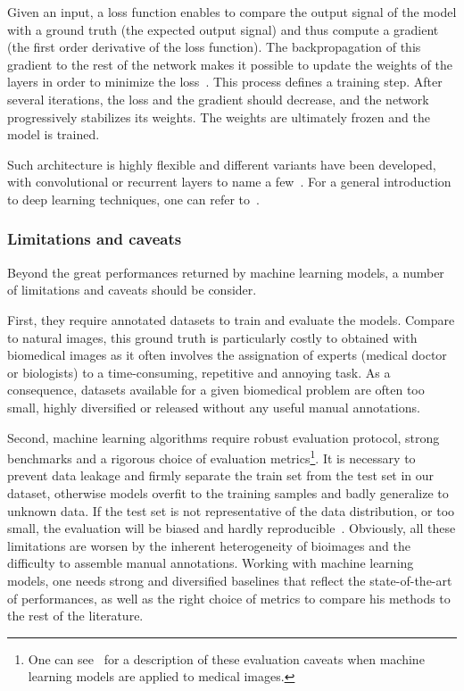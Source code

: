 Given an input, a loss function enables to compare the output signal of the model with a ground truth (the expected output signal) and thus compute a gradient (the first order derivative of the loss function).
The backpropagation of this gradient to the rest of the network makes it possible to update the weights of the layers in order to minimize the loss~\cite{rumelhart_learning_1986}.
This process defines a training step.
After several iterations, the loss and the gradient should decrease, and the network progressively stabilizes its weights.
The weights are ultimately frozen and the model is trained.

Such architecture is highly flexible and different variants have been developed, with convolutional or recurrent layers to name a few~\cite{lecun_deep_2015}.
For a general introduction to deep learning techniques, one can refer to~\cite{Goodfellow_2016}.

\subsubsection{Limitations and caveats}

Beyond the great performances returned by machine learning models, a number of limitations and caveats should be consider.

First, they require annotated datasets to train and evaluate the models.
Compare to natural images, this ground truth is particularly costly to obtained with biomedical images as it often involves the assignation of experts (medical doctor or biologists) to a time-consuming, repetitive and annoying task.
As a consequence, datasets available for a given biomedical problem are often too small, highly diversified or released without any useful manual annotations.

Second, machine learning algorithms require robust evaluation protocol, strong benchmarks and a rigorous choice of evaluation metrics\footnote{One can see~\cite{varoquaux_machine_2022} for a description of these evaluation caveats when machine learning models are applied to medical images.}.
It is necessary to prevent data leakage and firmly separate the train set from the test set in our dataset, otherwise models overfit to the training samples and badly generalize to unknown data.
If the test set is not representative of the data distribution, or too small, the evaluation will be biased and hardly reproducible~\cite{Varoquaux_cv_2018}.
Obviously, all these limitations are worsen by the inherent heterogeneity of bioimages and the difficulty to assemble manual annotations.
Working with machine learning models, one needs strong and diversified baselines that reflect the state-of-the-art of performances, as well as the right choice of metrics to compare his methods to the rest of the literature.


